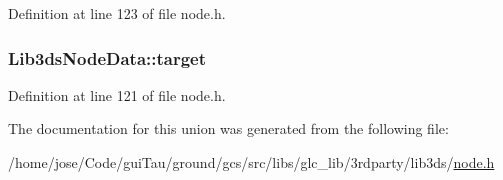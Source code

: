 Definition at line 123 of file node.\-h.

\hypertarget{union_lib3ds_node_data_a88266304b08754042e2754ac10fc94d2}{
\subsubsection[{target}]{ Lib3ds\-Node\-Data\-::target}}\label{union_lib3ds_node_data_a88266304b08754042e2754ac10fc94d2}


Definition at line 121 of file node.\-h.



The documentation for this union was generated from the following file\-:\begin{DoxyCompactItemize}
\item 
/home/jose/\-Code/gui\-Tau/ground/gcs/src/libs/glc\-\_\-lib/3rdparty/lib3ds/\hyperlink{node_8h}{node.\-h}\end{DoxyCompactItemize}

